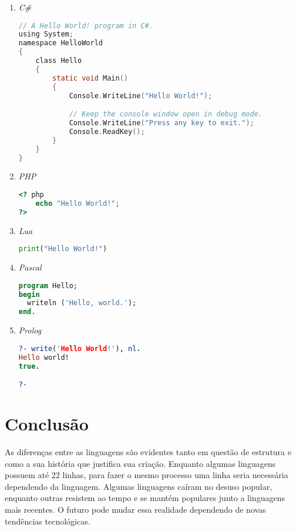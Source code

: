 \documentclass[conference]{IEEEtran}
\begin{document}
\begin{enumerate}[I]
\item \textit{C\#}

\begin{lstlisting}[language=C, caption=Exemplo em \textit{C\#}]
// A Hello World! program in C#.
using System;
namespace HelloWorld
{
    class Hello 
    {
        static void Main() 
        {
            Console.WriteLine("Hello World!");

            // Keep the console window open in debug mode.
            Console.WriteLine("Press any key to exit.");
            Console.ReadKey();
        }
    }
}
\end{lstlisting}

\item \textit{PHP}

\begin{lstlisting}[language=PHP, caption=Exemplo em \textit{PHP}]
<? php
    echo "Hello World!";
?>
\end{lstlisting}

\item \textit{Lua}

\begin{lstlisting}[language=Python, caption=Exemplo em \textit{Lua}]
print("Hello World!")
\end{lstlisting}

\item \textit{Pascal}

\begin{lstlisting}[language=Pascal, caption=Exemplo em \textit{Pascal}]
program Hello;
begin
  writeln ('Hello, world.');
end.
\end{lstlisting}

\item \textit{Prolog}

\begin{lstlisting}[language=Prolog, caption=Exemplo em \textit{Prolog}]
?- write('Hello World!'), nl.
Hello world!
true.

?-
\end{lstlisting}

\end{enumerate}


\section*{Conclusão}

As diferenças entre as linguagens são evidentes tanto em questão de estrutura e como a sua história que justifica sua criação. Enquanto algumas linguagens possuem até 22 linhas, para fazer o mesmo processo uma linha seria necessária dependendo da linguagem. Algumas linguagens caíram no desuso popular, enquanto outras resistem ao tempo e se mantém populares junto a linguagens mais recentes. O futuro pode mudar essa realidade dependendo de novas tendências tecnológicas.
\end{document}

